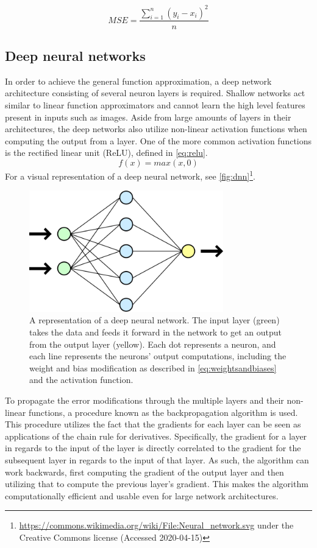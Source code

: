 \documentclass{kththesis}
\begin{document}
\begin{equation}
\label{eq:mse}
MSE = \frac{\sum_{i=1}^n (y_i - x_i)^2}{n}
\end{equation}

\subsection{Deep neural networks}
In order to achieve the general function approximation, a deep network architecture consisting of several neuron layers is required. Shallow networks act similar to linear function approximators and cannot learn the high level features present in inputs such as images. Aside from large amounts of layers in their architectures, the deep networks also utilize non-linear activation functions when computing the output from a layer. One of the more common activation functions is the rectified linear unit (ReLU), defined in \autoref{eq:relu}.
\begin{equation}
\label{eq:relu}
f(x) = max(x, 0)
\end{equation}
For a visual representation of a deep neural network, see \autoref{fig:dnn}\footnote{\url{https://commons.wikimedia.org/wiki/File:Neural_network.svg} under the Creative Commons license (Accessed 2020-04-15)}.

\begin{figure}
\centering
\includegraphics[width=0.75\textwidth]{dnn.png}
\caption{A representation of a deep neural network. The input layer (green) takes the data and feeds it forward in the network to get an output from the output layer (yellow). Each dot represents a neuron, and each line represents the neurons' output computations, including the weight and bias modification as described in \autoref{eq:weightsandbiases} and the activation function.}
\label{fig:dnn}
\end{figure}

To propagate the error modifications through the multiple layers and their non-linear functions, a procedure known as the backpropagation algorithm is used. This procedure utilizes the fact that the gradients for each layer can be seen as applications of the chain rule for derivatives. Specifically, the gradient for a layer in regards to the input of the layer is directly correlated to the gradient for the subsequent layer in regards to the input of that layer. As such, the algorithm can work backwards, first computing the gradient of the output layer and then utilizing that to compute the previous layer's gradient. This makes the algorithm computationally efficient and usable even for large network architectures. \parencite{Goodfellow-et-al-2016} 
\end{document}
